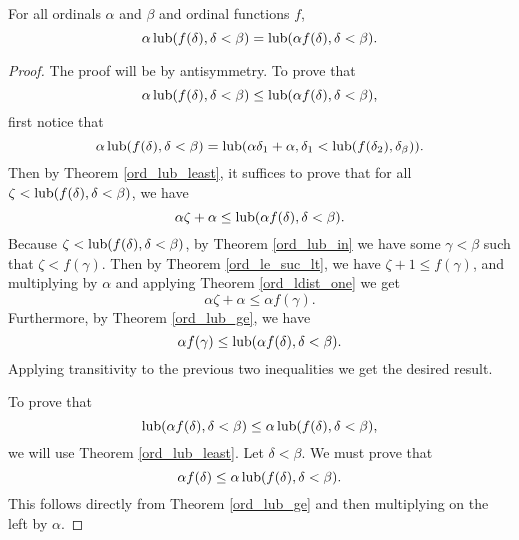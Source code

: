 \documentclass[../../math.tex]{subfiles}
\begin{document}
\begin{theorem} \label{ord_lub_mult}
    For all ordinals $\alpha$ and $\beta$ and ordinal functions $f$,
    \[
        \alpha \operatorname{lub}(f(\delta), \delta < \beta) = \operatorname{lub}(\alpha f(\delta),
        \delta < \beta).
    \]
\end{theorem}
\begin{proof}
    The proof will be by antisymmetry.  To prove that
    \[
        \alpha \operatorname{lub}(f(\delta), \delta < \beta)
        \leq \operatorname{lub}(\alpha f(\delta), \delta < \beta),
    \]
    first notice that
    \[
        \alpha \operatorname{lub}(f(\delta), \delta < \beta)
        = \operatorname{lub}(\alpha \delta_1 + \alpha,
            \delta_1 < \operatorname{lub}(f(\delta_2), \delta_\beta)).
    \]
    Then by Theorem \ref{ord_lub_least}, it suffices to prove that for all
    $\zeta < \operatorname{lub}(f(\delta), \delta < \beta)$, we have
    \[
        \alpha \zeta + \alpha \leq \operatorname{lub}(\alpha f(\delta), \delta < \beta).
    \]
    Because $\zeta < \operatorname{lub}(f(\delta), \delta < \beta)$, by Theorem
    \ref{ord_lub_in} we have some $\gamma < \beta$ such that $\zeta <
    f(\gamma)$.  Then by Theorem \ref{ord_le_suc_lt}, we have $\zeta + 1 \leq
    f(\gamma)$, and multiplying by $\alpha$ and applying Theorem
    \ref{ord_ldist_one} we get
    \[
        \alpha \zeta + \alpha \leq \alpha f(\gamma).
    \]
    Furthermore, by Theorem \ref{ord_lub_ge}, we have
    \[
        \alpha f(\gamma) \leq \operatorname{lub}(\alpha f(\delta), \delta < \beta).
    \]
    Applying transitivity to the previous two inequalities we get the desired
    result.

    To prove that
    \[
        \operatorname{lub}(\alpha f(\delta), \delta < \beta)
        \leq \alpha \operatorname{lub}(f(\delta), \delta < \beta),
    \]
    we will use Theorem \ref{ord_lub_least}.  Let $\delta < \beta$.  We must
    prove that
    \[
        \alpha f(\delta) \leq \alpha \operatorname{lub}(f(\delta), \delta < \beta).
    \]
    This follows directly from Theorem \ref{ord_lub_ge} and then multiplying on
    the left by $\alpha$.
\end{proof}
\end{document}
